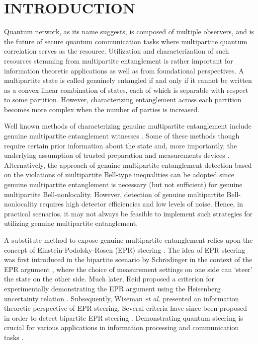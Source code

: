 \documentclass[pra,a4paper,aps,twocolumn,showpacs,superscriptaddress,groupedaddress]{revtex4}
\begin{document}
\maketitle


\section{INTRODUCTION}

Quantum network, as its name suggests, is composed of multiple observers, and is the future of secure quantum communication  tasks where multipartite quantum correlation serves as the resource. Utilization and characterization of such resources stemming from multipartite entanglement \cite{KarolZ} is rather important for  information theoretic applications \cite{Mur,Hil,Sor,Rau,Sca,Zha,ap3,Bri,Hyl,toth2} as well as from foundational perspectives. A multipartite state is called genuinely entangled \cite{Guh} if and only if  it cannot be written as a convex linear combination of states, each of which is separable  with respect to some partition. However, characterizing entanglement across each partition becomes more complex when the number of parties is increased.

Well known methods of characterizing genuine multipartite entanglement include genuine multipartite entanglement witnesses \cite{Acin,Bruss,Bou,Guh,entropic}. Some
of these methods though require certain prior information about the state and, more importantly, the underlying assumption of trusted preparation and measurements devices  \cite{Rosset}. Alternatively, the approach of genuine multipartite entanglement detection based on the violations of multipartite Bell-type inequalities \cite{svet,See,Coll,Uff,Sev,Nag,Pal,Ban2,Ban1,Lia} can be adopted since genuine multipartite entanglement is necessary (but not sufficient) for genuine multipartite Bell-nonlocality. However, detection of genuine multipartite Bell-nonlocality requires high detector efficiencies and low levels of noise. Hence, in practical scenarios, it may not always be feasible to implement such strategies for utilizing genuine multipartite entanglement. 

A substitute method to expose genuine multipartite entanglement relies upon the concept of Einstein-Podolsky-Rosen (EPR) steering \cite{steerreview}. The idea of EPR steering was first introduced in the bipartite scenario by Schr$\ddot{o}$dinger \cite{Schr1,Schr2} in the context of the  EPR argument \cite{epr}, where the choice of measurement settings  on one side can `steer' the state on the other side. Much later, Reid proposed a criterion for experimentally demonstrating the EPR argument using the Heisenberg uncertainty relation \cite{Reid}. Subsequently, Wiseman \textit{et al.} \cite{Wise1,Wise2} presented an information theoretic perspective  of EPR steering. Several criteria have since been  proposed in order to detect bipartite EPR steering \cite{Cavalcanti1,Cavalcanti2,Pramanik1,Pramanik,Pramanik2,Cavalcanti3,Maity1,DDJ+17}. Demonstrating quantum steering is crucial  for various applications in information processing and communication tasks \cite{branciard,app1,app3,app4,app5,app6,supic,jeba,peng}.
 
\end{document}
